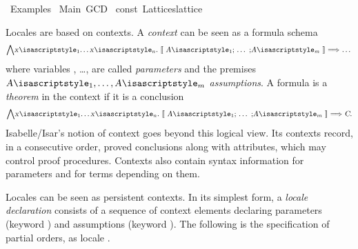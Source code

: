 %
\begin{isabellebody}%
\def\isabellecontext{Examples}%
%
\isadelimtheory
%
\endisadelimtheory
%
\isatagtheory
{}\isamarkupfalse%
\ Examples\isanewline
{}\ Main\ GCD\isanewline
{}%
\endisatagtheory
{\isafoldtheory}%
%
\isadelimtheory
\isanewline
%
\endisadelimtheory
%
\isadeliminvisible
\isanewline
%
\endisadeliminvisible
%
\isataginvisible
{}\isamarkupfalse%
\ const\ Lattices{\isachardot}lattice\isanewline
{}\isamarkupfalse%
\ {}{}%
\endisataginvisible
{\isafoldinvisible}%
%
\isadeliminvisible
%
\endisadeliminvisible
%
\isamarkuptrue%
%
\begin{isamarkuptext}%
Locales are based on contexts.  A \emph{context} can be seen as a
  formula schema
\[
  \isa{{\isasymAnd}x\isactrlsub {\isadigit{1}}{\isasymdots}x\isactrlsub n{\isachardot}\ {\isasymlbrakk}\ A\isactrlsub {\isadigit{1}}{\isacharsemicolon}\ {\isasymdots}\ {\isacharsemicolon}A\isactrlsub m\ {\isasymrbrakk}\ {\isasymLongrightarrow}\ {\isasymdots}}
\]
  where variables , \ldots,  are called
  \emph{parameters} and the premises $\isa{A\isactrlsub {\isadigit{1}}}, \ldots,
  \isa{A\isactrlsub m}$ \emph{assumptions}.  A formula 
  is a \emph{theorem} in the context if it is a conclusion
\[
  \isa{{\isasymAnd}x\isactrlsub {\isadigit{1}}{\isasymdots}x\isactrlsub n{\isachardot}\ {\isasymlbrakk}\ A\isactrlsub {\isadigit{1}}{\isacharsemicolon}\ {\isasymdots}\ {\isacharsemicolon}A\isactrlsub m\ {\isasymrbrakk}\ {\isasymLongrightarrow}\ C}.
\]
  Isabelle/Isar's notion of context goes beyond this logical view.
  Its contexts record, in a consecutive order, proved
  conclusions along with attributes, which
  may control proof procedures.  Contexts also contain syntax information
  for parameters and for terms depending on them.%
\end{isamarkuptext}%
\isamarkuptrue%
%
\isamarkuptrue%
%
\begin{isamarkuptext}%
Locales can be seen as persistent contexts.  In its simplest form, a
  \emph{locale declaration} consists of a sequence of context elements
  declaring parameters (keyword ) and assumptions
  (keyword ).  The following is the specification of
  partial orders, as locale .%
\end{isamarkuptext}%

\end{isabellebody}
